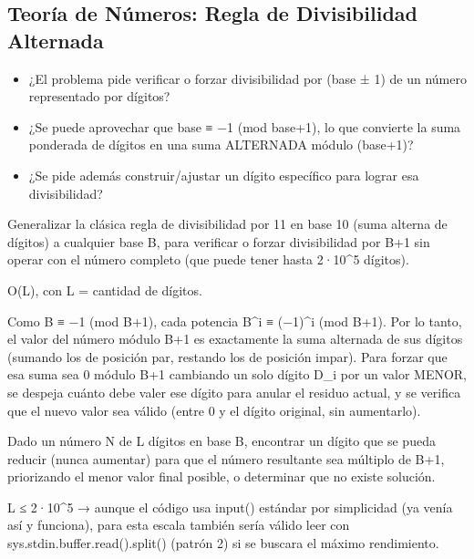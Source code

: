 \subsection{Teoría de Números: Regla de Divisibilidad Alternada}


\begin{itemize}
\item ¿El problema pide verificar o forzar divisibilidad por (base ± 1) de un número representado por dígitos?
\item ¿Se puede aprovechar que base ≡ −1 (mod base+1), lo que convierte la suma ponderada de dígitos en una suma ALTERNADA módulo (base+1)?
\item ¿Se pide además construir/ajustar un dígito específico para lograr esa divisibilidad?
\end{itemize}

 Generalizar la clásica regla de divisibilidad por 11 en base 10 (suma alterna de dígitos) a cualquier base B, para verificar o forzar divisibilidad por B+1 sin operar con el número completo (que puede tener hasta 2·10\textasciicircum{}5 dígitos).

 O(L), con L = cantidad de dígitos.

 Como B ≡ −1 (mod B+1), cada potencia B\textasciicircum{}i ≡ (−1)\textasciicircum{}i (mod B+1). Por lo tanto, el valor del número módulo B+1 es exactamente la suma alternada de sus dígitos (sumando los de posición par, restando los de posición impar). Para forzar que esa suma sea 0 módulo B+1 cambiando un solo dígito D\_i por un valor MENOR, se despeja cuánto debe valer ese dígito para anular el residuo actual, y se verifica que el nuevo valor sea válido (entre 0 y el dígito original, sin aumentarlo).


Dado un número N de L dígitos en base B, encontrar un dígito que se pueda reducir (nunca aumentar) para que el número resultante sea múltiplo de B+1, priorizando el menor valor final posible, o determinar que no existe solución.

 L ≤ 2·10\textasciicircum{}5 → aunque el código usa input() estándar por simplicidad (ya venía así y funciona), para esta escala también sería válido leer con sys.stdin.buffer.read().split() (patrón 2) si se buscara el máximo rendimiento.


